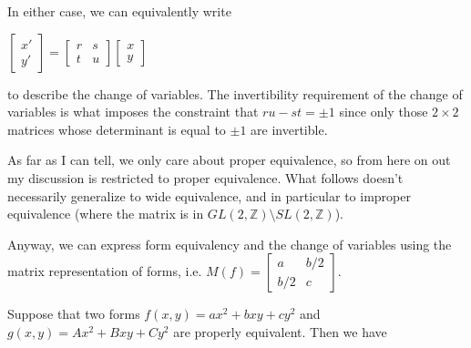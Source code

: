 \documentclass{article}
\theoremstyle{definition}
\theoremstyle{theorem}
\theoremstyle{example}
\theoremstyle{corollary}
\begin{document}
\bigskip

In either case, we can equivalently write
\begin{center}
\(\begin{bmatrix} x' \\ y' \end{bmatrix} = \begin{bmatrix} r & s \\ t & u \end{bmatrix} \begin{bmatrix} x \\ y \end{bmatrix}\)
\end{center}
to describe the change of variables. The invertibility requirement of the change of variables is what imposes the constraint that \(ru - st = \pm 1\) since only those \(2 \times 2\) matrices whose determinant is equal to \(\pm 1\) are invertible.

\bigskip

As far as I can tell, we only care about proper equivalence, so from here on out my discussion is restricted to proper equivalence. What follows doesn't necessarily generalize to wide equivalence, and in particular to improper equivalence (where the matrix is in \(GL(2, \mathbb{Z}) \setminus SL(2, \mathbb{Z})\)).

\bigskip

Anyway, we can express form equivalency and the change of variables using the matrix representation of forms, i.e. \(M(f) = \begin{bmatrix} a & b/2 \\ b/2 & c \end{bmatrix}\).

\bigskip

Suppose that two forms \(f (x, y) = a x^{2} + b xy + c y^{2}\) and \(g (x, y) = A x^{2} + B xy + C y^{2}\) are properly equivalent. Then we have

\bigskip
\end{document}
